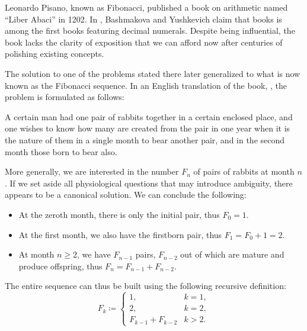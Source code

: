 \begin{example}\label{ex:fibonacci_rabbits}
  Leonardo Pisano, known as Fibonacci, published a book on arithmetic named \enquote{Liber Abaci} in 1202. In \cite[54]{АлександровМаркушевичХинчинЭнциклопедия1951Том1}, Bashmakova and Yushkevich claim that books is among the first books featuring decimal numerals. Despite being influential, the book lacks the clarity of exposition that we can afford now after centuries of polishing existing concepts.

  The solution to one of the problems stated there later generalized to what is now known as the Fibonacci sequence. In an English translation of the book, \cite{Sigler2002LiberAbaci}, the problem is formulated as follows:
  \begin{displayquote}
    A certain man had one pair of rabbits together in a certain enclosed place, and one wishes to know how many are created from the pair in one year when it is the nature of them in a single month to bear another pair, and in the second month those born to bear also.
  \end{displayquote}

  More generally, we are interested in the number \( F_n \) of pairs of rabbits at month \( n \). If we set aside all physiological questions that may introduce ambiguity, there appears to be a canonical solution. We can conclude the following:
  \begin{itemize}
    \item At the zeroth month, there is only the initial pair, thus \( F_0 = 1 \).

    \item At the first month, we also have the firstborn pair, thus \( F_1 = F_0 + 1 = 2 \).

    \item At month \( n \geq 2 \), we have \( F_{n-1} \) pairs, \( F_{n-2} \) out of which are mature and produce offspring, thus \( F_n = F_{n-1} + F_{n-2} \).
  \end{itemize}

  The entire sequence can thus be built using the following recursive definition:
  \begin{equation*}
    F_k \coloneqq \begin{cases}
      1,                &k = 1, \\
      2,                &k = 2, \\
      F_{k-1} + F_{k-2} &k > 2.
    \end{cases}
  \end{equation*}


\end{example}
